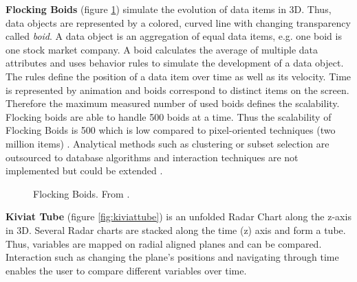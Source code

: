 \textbf{Flocking Boids} (figure \ref{fig:flockingboids}) simulate the evolution of data items in 3D. Thus, data objects are represented by a colored, curved line with changing transparency called \textit{boid}.  A data object is an aggregation of equal data items, e.g. one boid is one stock market company. A boid calculates the average of multiple data attributes and uses behavior rules to simulate the development of a data object. The rules define the position of a data item over time as well as its velocity. Time is represented by animation and boids correspond to distinct items on the screen. Therefore the maximum measured number of used boids defines the scalability. Flocking boids are able to handle 500 boids at a time. Thus the scalability of Flocking Boids is 500 which is low compared to pixel-oriented techniques (two million items)  \cite{Moere2004}.
Analytical methods such as clustering or subset selection are outsourced to database algorithms and interaction techniques are not implemented but could be extended \cite{Moere2004}. 
\begin{figure}[H]
    \centering
    \caption[Flocking Boids]{Flocking Boids. From  \cite{Aigner2011}.}
    \label{fig:flockingboids}
\end{figure}
\par
\textbf{Kiviat Tube} (figure \ref{fig:kiviattube}) is an unfolded Radar Chart along the z-axis in 3D. Several Radar charts are stacked along the time (z) axis and form a tube. Thus, variables are mapped on radial aligned planes and can be compared. Interaction such as changing the plane's positions and navigating through time enables the user to compare different variables over time.
